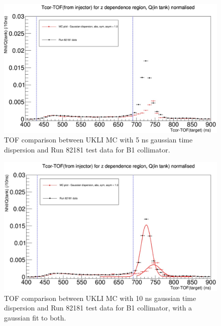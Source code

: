 \begin{figure}
    \centering
    \includegraphics[width=\textwidth]{Figures/Inked5ns_gaussian_dispersion_comparison.jpg}
    \caption{TOF comparison between UKLI MC with 5 ns gaussian time dispersion and Run 82181 test data for B1 collimator.}
    \label{fig:5ns_time_dispersion}
\end{figure}

\begin{figure}
    \centering
    \includegraphics[width=\textwidth]{Figures/Inked10ns_gaussian_dispersion_with_fit.jpg}
    \caption{TOF comparison between UKLI MC with 10 ns gaussian time dispersion and Run 82181 test data for B1 collimator, with a gaussian fit to both.}
    \label{fig:10ns_time_dispersion}
\end{figure}

